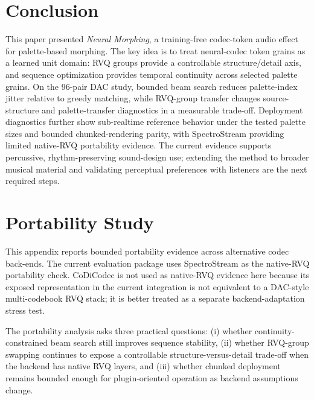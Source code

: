 \documentclass[twoside,a4paper]{article}
\begin{document}
\section{Conclusion}
This paper presented \emph{Neural Morphing}, a training-free codec-token audio effect for palette-based morphing. The key idea is to treat neural-codec token grains as a learned unit domain: RVQ groups provide a controllable structure/detail axis, and sequence optimization provides temporal continuity across selected palette grains. On the 96-pair DAC study, bounded beam search reduces palette-index jitter relative to greedy matching, while RVQ-group transfer changes source-structure and palette-transfer diagnostics in a measurable trade-off. Deployment diagnostics further show sub-realtime reference behavior under the tested palette sizes and bounded chunked-rendering parity, with SpectroStream providing limited native-RVQ portability evidence. The current evidence supports percussive, rhythm-preserving sound-design use; extending the method to broader musical material and validating perceptual preferences with listeners are the next required steps.





\appendix

\section{Portability Study}\label{sec:app-portability}

This appendix reports bounded portability evidence across alternative codec back-ends. The current evaluation package uses SpectroStream \cite{Li:2025:SpectroStream} as the native-RVQ portability check. CoDiCodec \cite{Pasini:2025:CoDiCodec} is not used as native-RVQ evidence here because its exposed representation in the current integration is not equivalent to a DAC-style multi-codebook RVQ stack; it is better treated as a separate backend-adaptation stress test.

The portability analysis asks three practical questions: (i) whether continuity-constrained beam search still improves sequence stability, (ii) whether RVQ-group swapping continues to expose a controllable structure-versus-detail trade-off when the backend has native RVQ layers, and (iii) whether chunked deployment remains bounded enough for plugin-oriented operation as backend assumptions change.
\end{document}
